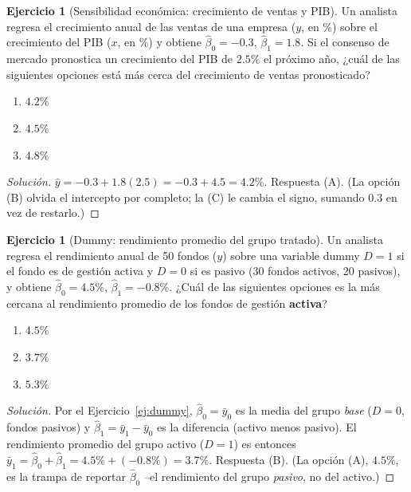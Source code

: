 \documentclass[11pt,a4paper,oneside]{article}
\theoremstyle{plain}
\theoremstyle{definition}
\newtheorem{exercise}[teorema]{Ejercicio}
\begin{document}
\begin{exercise}[Sensibilidad económica: crecimiento de ventas y PIB]\label{ej:cfa-sensibilidad}
Un analista regresa el crecimiento anual de las ventas de una empresa
($y$, en \%) sobre el crecimiento del PIB ($x$, en \%) y obtiene
$\hat\beta_0=-0.3$, $\hat\beta_1=1.8$. Si el consenso de mercado
pronostica un crecimiento del PIB de $2.5\%$ el próximo año, ¿cuál de
las siguientes opciones está más cerca del crecimiento de ventas
pronosticado?
\begin{enumerate}[label=(\Alph*),nosep,leftmargin=2.2em]
  \item $4.2\%$
  \item $4.5\%$
  \item $4.8\%$
\end{enumerate}
\end{exercise}
\begin{proof}[Solución]
$\hat y = -0.3+1.8(2.5) = -0.3+4.5 = 4.2\%$. Respuesta (A). (La opción
(B) olvida el intercepto por completo; la (C) le cambia el signo,
sumando $0.3$ en vez de restarlo.)
\end{proof}

\begin{exercise}[Dummy: rendimiento promedio del grupo tratado]\label{ej:cfa-dummy}
Un analista regresa el rendimiento anual de 50 fondos ($y$) sobre una
variable dummy $D=1$ si el fondo es de gestión activa y $D=0$ si es
pasivo (30 fondos activos, 20 pasivos), y obtiene $\hat\beta_0=4.5\%$,
$\hat\beta_1=-0.8\%$. ¿Cuál de las siguientes opciones es la más
cercana al rendimiento promedio de los fondos de gestión \textbf{activa}?
\begin{enumerate}[label=(\Alph*),nosep,leftmargin=2.2em]
  \item $4.5\%$
  \item $3.7\%$
  \item $5.3\%$
\end{enumerate}
\end{exercise}
\begin{proof}[Solución]
Por el Ejercicio~\ref{ej:dummy}, $\hat\beta_0=\bar y_0$ es la media del
grupo \emph{base} ($D=0$, fondos pasivos) y $\hat\beta_1=\bar
y_1-\bar y_0$ es la diferencia (activo menos pasivo). El rendimiento
promedio del grupo activo ($D=1$) es entonces
$\bar y_1=\hat\beta_0+\hat\beta_1=4.5\%+(-0.8\%)=3.7\%$. Respuesta (B).
(La opción (A), $4.5\%$, es la trampa de reportar $\hat\beta_0$
--el rendimiento del grupo \emph{pasivo}, no del activo.)
\end{proof}
\end{document}
